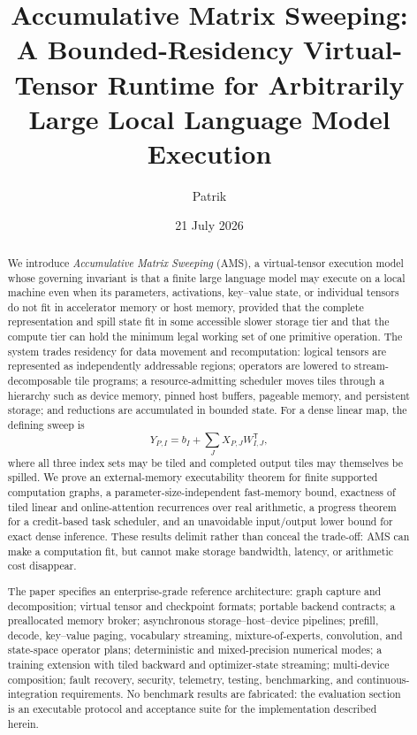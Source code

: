 \documentclass[11pt,reqno]{amsart}
\title[Accumulative Matrix Sweeping]{Accumulative Matrix Sweeping:\\A Bounded-Residency Virtual-Tensor Runtime for Arbitrarily Large Local Language Model Execution}
\author{Patrik}
\date{21 July 2026}
\theoremstyle{definition}
\theoremstyle{remark}
\newcommand{\AMS}{\textsc{AMS}\xspace}
\begin{document}
\begin{abstract}
We introduce \emph{Accumulative Matrix Sweeping} (\AMS), a virtual-tensor execution model whose governing invariant is that a finite large language model may execute on a local machine even when its parameters, activations, key--value state, or individual tensors do not fit in accelerator memory or host memory, provided that the complete representation and spill state fit in some accessible slower storage tier and that the compute tier can hold the minimum legal working set of one primitive operation. The system trades residency for data movement and recomputation: logical tensors are represented as independently addressable regions; operators are lowered to stream-decomposable tile programs; a resource-admitting scheduler moves tiles through a hierarchy such as device memory, pinned host buffers, pageable memory, and persistent storage; and reductions are accumulated in bounded state. For a dense linear map, the defining sweep is
\[
  Y_{P,I} = b_I + \sum_J X_{P,J}W_{I,J}^{\mathsf T},
\]
where all three index sets may be tiled and completed output tiles may themselves be spilled. We prove an external-memory executability theorem for finite supported computation graphs, a parameter-size-independent fast-memory bound, exactness of tiled linear and online-attention recurrences over real arithmetic, a progress theorem for a credit-based task scheduler, and an unavoidable input/output lower bound for exact dense inference. These results delimit rather than conceal the trade-off: \AMS can make a computation fit, but cannot make storage bandwidth, latency, or arithmetic cost disappear.

The paper specifies an enterprise-grade reference architecture: graph capture and decomposition; virtual tensor and checkpoint formats; portable backend contracts; a preallocated memory broker; asynchronous storage--host--device pipelines; prefill, decode, key--value paging, vocabulary streaming, mixture-of-experts, convolution, and state-space operator plans; deterministic and mixed-precision numerical modes; a training extension with tiled backward and optimizer-state streaming; multi-device composition; fault recovery, security, telemetry, testing, benchmarking, and continuous-integration requirements. No benchmark results are fabricated: the evaluation section is an executable protocol and acceptance suite for the implementation described herein.
\end{abstract}

\maketitle
\tableofcontents
\end{document}
